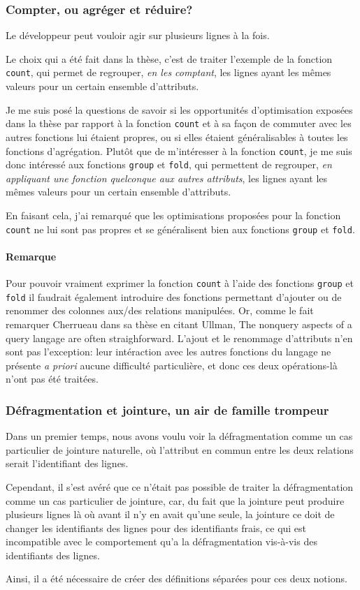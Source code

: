 \subsubsection*{Compter, ou agréger et réduire?}
Le développeur peut vouloir agir sur plusieurs lignes à la fois.

Le choix qui a été fait dans la thèse, c'est de traiter l'exemple
de la fonction \lstinline|count|, qui permet de regrouper, \emph{en les comptant},
les lignes ayant les mêmes valeurs pour un certain ensemble d'attributs.

Je me suis posé la questions de savoir si les opportunités d'optimisation
exposées dans la thèse par rapport à la fonction \lstinline|count| et à sa façon de commuter
avec les autres fonctions lui étaient propres, ou si elles étaient généralisables
à toutes les fonctions d'agrégation. Plutôt que de m'intéresser à la fonction
\lstinline|count|, je me suis donc intéressé 
aux fonctions \lstinline|group| et \lstinline|fold|, qui permettent
de regrouper, \emph{en appliquant une fonction quelconque aux autres attributs},
les lignes ayant les mêmes valeurs pour un certain ensemble d'attributs.

En faisant cela, j'ai remarqué que les optimisations proposées pour la fonction
\lstinline|count| ne lui sont pas propres et se généralisent bien aux
fonctions \lstinline|group| et \lstinline|fold|.

\paragraph*{Remarque}
Pour pouvoir vraiment exprimer la fonction \lstinline|count|
à l'aide des fonctions \lstinline|group| et \lstinline|fold|
il faudrait également introduire des fonctions permettant d'ajouter ou de 
renommer des colonnes aux/des relations manipulées.
Or, comme le fait remarquer Cherrueau dans sa thèse en citant Ullman,
\og The nonquery aspects of a query langage are often straighforward\fg{}.
L'ajout et le renommage d'attributs n'en sont pas l'exception:
leur intéraction avec les autres fonctions du langage ne présente 
\emph{a priori} aucune difficulté particulière, et donc ces deux opérations-là
n'ont pas été traitées.

\subsubsection*{Défragmentation et jointure, un air de famille trompeur}
Dans un premier temps, nous avons voulu voir la défragmentation comme un cas
particulier de jointure naturelle, où l'attribut en commun entre
les deux relations serait l'identifiant
des lignes.

Cependant, il s'est avéré que ce n'était pas possible de traiter la défragmentation
comme un cas particulier de jointure, car, du fait que la jointure
peut produire plusieurs lignes là où avant il n'y en avait qu'une seule,
la jointure ce doit de changer les identifiants des lignes pour des identifiants frais,
ce qui est incompatible avec le comportement qu'a la défragmentation
vis-à-vis des identifiants des lignes.

Ainsi, il a été nécessaire de créer des définitions séparées pour ces deux notions.